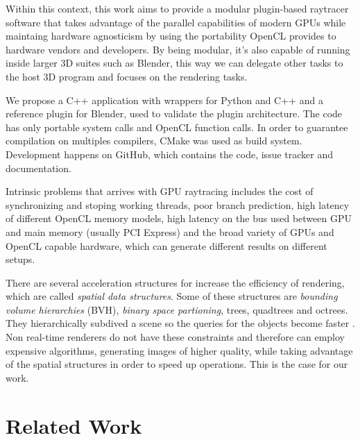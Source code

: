 \documentclass[a4paper]{sbgames}               %
\begin{document}
Within this context, this work aims to provide a modular plugin-based
raytracer software that takes advantage of the parallel capabilities
of modern GPUs while maintaing hardware agnosticism by using the
portability OpenCL provides to hardware vendors and developers. By
being modular, it's also capable of running inside larger 3D suites
such as Blender, this way we can delegate other tasks to the host 3D
program and focuses on the rendering tasks.

We propose a C++ application with wrappers for
Python %
and C++ and a reference plugin for Blender, used to validate the
plugin architecture. The code has only portable system calls and
OpenCL function calls. In order to guarantee compilation on multiples
compilers, CMake was used as build system. Development happens on
GitHub, which contains the code, issue tracker and
documentation.

Intrinsic problems that arrives with GPU raytracing includes the cost
of synchronizing and stoping working threads, poor branch prediction,
high latency of different OpenCL memory models, high latency on the
bus used between GPU and main memory (usually PCI Express) and the
broad variety of GPUs and OpenCL capable hardware, which can generate
different results on different setups.

There are several acceleration structures for increase the efficiency
of rendering, which are called \emph{spatial data structures}. Some of
these structures are \emph{bounding volume hierarchies} (BVH),
\emph{binary space partioning}, trees, quadtrees and octrees. They
hierarchically subdived a scene so the queries for the objects become
faster \cite{akenine-moller:2008}. Non real-time renderers do not have
these constraints and therefore can employ expensive algorithms,
generating images of higher quality, while taking advantage of the
spatial structures in order to speed up operations. This is the case
for our work.

\section{Related Work}
\label{sec:related-work}
\end{document}

